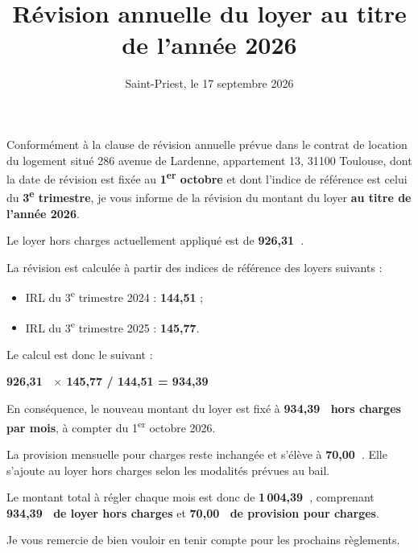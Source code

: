 \documentclass[11pt,a4paper,sans]{moderncv}
\title{Révision annuelle du loyer au titre de l'année 2026}
\date{Saint-Priest, le 17 septembre 2026}
\newcommand{\adresseLogement}{286 avenue de Lardenne, appartement 13, 31100 Toulouse}
\newcommand{\priseEffet}{à compter du 1\textsuperscript{er} octobre 2026}
\begin{document}
    \makelettertitle

    Conformément à la clause de révision annuelle prévue dans le contrat de location du logement situé \adresseLogement, dont la date de révision est fixée au \textbf{1\textsuperscript{er} octobre} et dont l'indice de référence est celui du \textbf{3\textsuperscript{e} trimestre}, je vous informe de la révision du montant du loyer \textbf{au titre de l'année 2026}.

    Le loyer hors charges actuellement appliqué est de \textbf{926,31~\texteuro}.

    La révision est calculée à partir des indices de référence des loyers suivants :
    \begin{itemize}
        \item IRL du 3\textsuperscript{e} trimestre 2024 : \textbf{144,51} ;
        \item IRL du 3\textsuperscript{e} trimestre 2025 : \textbf{145,77}.
    \end{itemize}

    Le calcul est donc le suivant :
    \begin{center}
        \textbf{926,31~\texteuro{} $\times$ 145,77 / 144,51 = 934,39~\texteuro}
    \end{center}

    En conséquence, le nouveau montant du loyer est fixé à \textbf{934,39~\texteuro{} hors charges par mois}, \priseEffet.

    La provision mensuelle pour charges reste inchangée et s'élève à \textbf{70,00~\texteuro}. Elle s'ajoute au loyer hors charges selon les modalités prévues au bail.

    Le montant total à régler chaque mois est donc de \textbf{1\,004,39~\texteuro}, comprenant \textbf{934,39~\texteuro{} de loyer hors charges} et \textbf{70,00~\texteuro{} de provision pour charges}.

    Je vous remercie de bien vouloir en tenir compte pour les prochains règlements.

    \makeletterclosing
\end{document}
